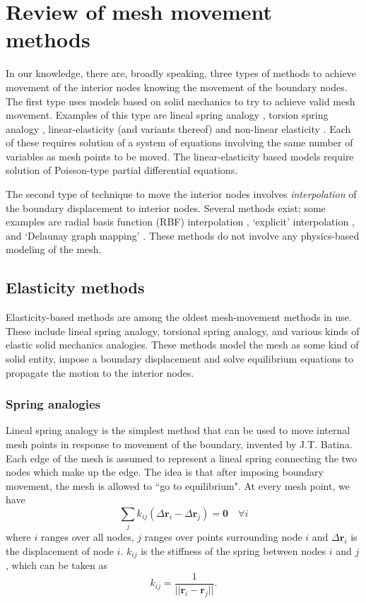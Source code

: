 \chapter{Review of mesh movement methods}

 In our knowledge, there are, broadly speaking, three types of methods to achieve movement of the interior nodes knowing the movement of the boundary nodes. The first type uses models based on solid mechanics to try to achieve valid mesh movement. Examples of this type are lineal spring analogy \cite{mm:batina}, torsion spring analogy \cite{mm:torsionsprings}, linear-elasticity (and variants thereof)\cite{curve:hartmann} and non-linear elasticity \cite{curve:persson}. Each of these requires solution of a system of equations involving the same number of variables as mesh points to be moved. The linear-elasticity based models require solution of Poisson-type partial differential equations.
 
 The second type of technique to move the interior nodes involves \emph{interpolation} of the boundary displacement to interior nodes. Several methods exist; some examples are radial basis function (RBF) interpolation \cite{mm:rbf}, `explicit' interpolation \cite{mm:explicit}, and `Delaunay graph mapping' \cite{mm:dgm}. These methods do not involve any physics-based modeling of the mesh.
 
 \section{Elasticity methods}
 Elasticity-based methods are among the oldest mesh-movement methods in use. These include lineal spring analogy, torsional spring analogy, and various kinds of elastic solid mechanics analogies. These methods model the mesh as some kind of solid entity, impose a boundary displacement and solve equilibrium equations to propagate the motion to the interior nodes.
 
 \subsection{Spring analogies}
 
 Lineal spring analogy is the simplest method that can be used to move internal mesh points in response to movement of the boundary, invented by J.T. Batina. Each edge of the mesh is assumed to represent a lineal spring connecting the two nodes which make up the edge. The idea is that after imposing boundary movement, the mesh is allowed to ``go to equilibrium". At every mesh point, we have
 \begin{equation}
 \sum_j k_{ij}(\Delta \mathbf{r}_i - \Delta \mathbf{r}_j) = \mathbf{0} \quad \forall i
 \label{spring}
 \end{equation}
 where $i$ ranges over all nodes, $j$ ranges over points surrounding node $i$ and $\Delta \mathbf{r}_i$ is the displacement of node $i$.
 $k_{ij}$ is the stiffness of the spring between nodes $i$ and $j$, which can be taken as
 \begin{equation}
 k_{ij} = \frac{1}{||\mathbf{r}_i - \mathbf{r}_j||}.
 \end{equation}
 
